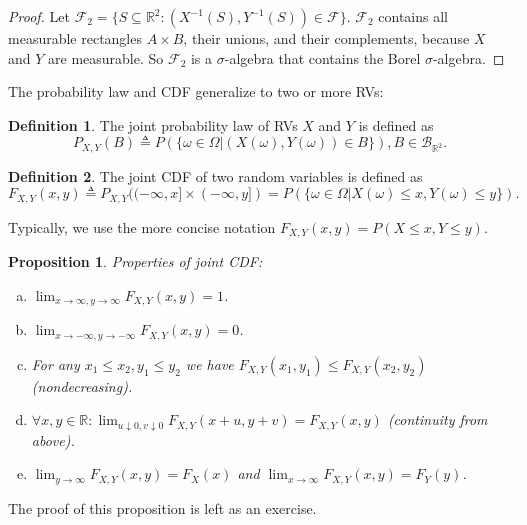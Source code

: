\documentclass{book}
\theoremstyle{plain}%
\newtheorem{proposition}{Proposition}[section]
\theoremstyle{definition}
\newtheorem{definition}{Definition}[section]
\newlength{\arrow}
\begin{document}
\begin{proof} Let $\mathcal F_2=\{S\subseteq \mathbb{R}^2\colon (X^{-1}(S),Y^{-1}(S))\in \mathcal F\}$. $\mathcal F_2$ contains all measurable rectangles $A\times B$, their unions, and their complements, because $X$ and $Y$ are measurable.  So $\mathcal F_2$ is a $\sigma$-algebra that contains the Borel $\sigma$-algebra.
\end{proof}


The probability law and CDF generalize to two or more RVs:

\begin{definition}
The joint probability law of RVs $X$ and $Y$ is defined as
$$P_{X,Y}(B) \triangleq P(\{\omega \in \Omega | (X(\omega), Y(\omega)) \in B\}), B \in \mathcal{B}_{\mathbb{R}^2}.$$
\end{definition}

\begin{definition}
The joint CDF of two random variables is defined as
$$F_{X,Y}(x,y) \triangleq P_{X,Y}((-\infty,x] \times (-\infty,y]) = P(\{\omega \in \Omega | X(\omega) \leq x, Y(\omega) \leq y\}).$$
\end{definition}

Typically, we use the more concise notation $F_{X,Y}(x,y) = P(X \leq x, Y \leq y)$.

\begin{proposition}
Properties of joint CDF:

\begin{enumerate}[(a)]
\item $\displaystyle \lim_{x \rightarrow \infty, y \rightarrow \infty} F_{X,Y}(x,y) = 1$.
\item $\displaystyle \lim_{x \rightarrow -\infty, y \rightarrow -\infty} F_{X,Y}(x,y) = 0$.
\item For any $x_1 \leq x_2, y_1 \leq y_2$ we have $F_{X,Y}(x_1,y_1) \leq F_{X,Y}(x_2,y_2)$ \textit{(nondecreasing)}.
\item $\forall x,y \in \mathbb{R}: \displaystyle \lim_{u \downarrow 0, v \downarrow 0} F_{X,Y}(x + u,y +v) = F_{X,Y}(x,y)$ \textit{(continuity from above)}.
\item $\displaystyle \lim_{y \rightarrow \infty} F_{X,Y}(x,y) = F_X(x)$ and $\displaystyle \lim_{x \rightarrow \infty} F_{X,Y}(x,y) = F_Y(y)$.
\end{enumerate}\label{prop:joint}
\end{proposition}

The proof of this proposition is left as an exercise.
\end{document}
